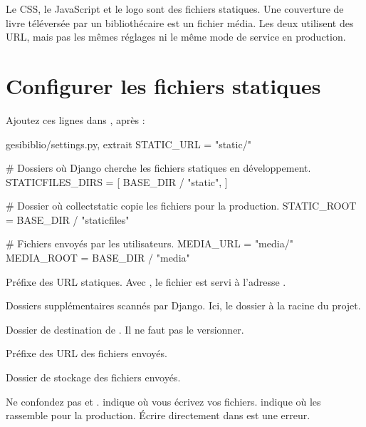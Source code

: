 \begin{retenir}
Le CSS, le JavaScript et le logo sont des fichiers statiques. Une couverture de
livre téléversée par un bibliothécaire est un fichier média. Les deux utilisent des
URL, mais pas les mêmes réglages ni le même mode de service en production.
\end{retenir}

\section{Configurer les fichiers statiques}

Ajoutez ces lignes dans , après  :

\begin{codebox}[python]{gesibiblio/settings.py, extrait}
STATIC_URL = "static/"

# Dossiers où Django cherche les fichiers statiques en développement.
STATICFILES_DIRS = [
    BASE_DIR / "static",
]

# Dossier où collectstatic copie les fichiers pour la production.
STATIC_ROOT = BASE_DIR / "staticfiles"

# Fichiers envoyés par les utilisateurs.
MEDIA_URL = "media/"
MEDIA_ROOT = BASE_DIR / "media"
\end{codebox}

\begin{description}[leftmargin=3.8cm,style=nextline]
  \item[\code{STATIC\_URL}] Préfixe des URL statiques. Avec ,
  le fichier  est servi à l'adresse
  .
  \item[\code{STATICFILES\_DIRS}] Dossiers supplémentaires scannés par Django.
  Ici, le dossier  à la racine du projet.
  \item[\code{STATIC\_ROOT}] Dossier de destination de . Il ne
  faut pas le versionner.
  \item[\code{MEDIA\_URL}] Préfixe des URL des fichiers envoyés.
  \item[\code{MEDIA\_ROOT}] Dossier de stockage des fichiers envoyés.
\end{description}

\begin{attention}
Ne confondez pas  et .
 indique où vous écrivez vos fichiers.
 indique où  les rassemble pour la
production. Écrire directement dans  est une erreur.
\end{attention}

